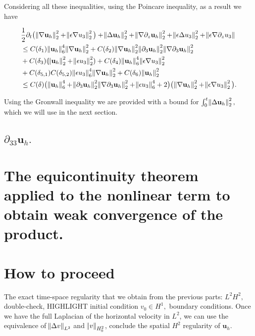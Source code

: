 \documentclass[11pt]{article}
\begin{document}
Considering all these inequalities, using the Poincare inequality, as a result we have

\begin{equation}
  \begin{split}
& \frac{1}{2} \partial_t  \big( \norm{\nabla \mathbf{u}_h}^2_2 + \norm{\epsilon \nabla u_3}^2_2 \big ) + \norm{\Delta \mathbf{u}_h}^2_2 + \norm{\nabla \partial_z \mathbf{u}_h}^2_2 + \norm{\epsilon \Delta u_3}^2_2 + \norm{\epsilon \nabla \partial_z u_3} \\
& \leq C(\delta_1) \norm{\mathbf{u}_h}^4_6 \norm{\nabla \mathbf{u}_h}_2^2 + C(\delta_2) \norm{\nabla \mathbf{u}_h}_2^2 \norm{\partial_3 \mathbf{u}_h}^2_2 \norm{\nabla \partial_3 \mathbf{u}_h}^2_2 \\
& + C(\delta_3) (\norm{ \mathbf{u}_h}^2_2 + \norm{ \epsilon u_3}^2_2) + C(\delta_4) \norm{\mathbf{u}_h}^4_6 \norm{\epsilon \nabla u_3}^2_2 \\
& + C(\delta_{5,1}) C(\delta_{5,2}) \norm{\epsilon u_3}^4_6 \norm{\nabla \mathbf{u}_h}^2_2 + C(\delta_6) \norm{\mathbf{u}_h}_2^2 \\
& \leq C(\delta) \big ( \norm{\mathbf{u}_h}^4_6 +\norm{\partial_3 \mathbf{u}_h}^2_2 \norm{\nabla \partial_3 \mathbf{u}_h}^2_2 + \norm{\epsilon u_3}^4_6 + 2 \big) \big( \norm{\nabla \mathbf{u}_h}^2_2 + \norm{\epsilon \nabla u_3}^2_2 \big ).
  \end{split}
\end{equation}

Using the Gronwall inequality we are provided with a bound for $\int_0^t \norm{\Delta \mathbf{u}_h}^2_2,$ which we will use in the next section.

\subsection{$\partial_{33} \mathbf{u}_h.$}

\section{The equicontinuity theorem applied to the nonlinear term to obtain weak convergence of the product.}

\section{How to proceed}

The exact time-space regularity that we obtain from the previous parts: $L^2 H^2,$ double-check, HIGHLIGHT initial condition $v_0 \in H^1,$ boundary conditions. Once we have the full Laplacian of the horizontal velocity in $L^2$, we can use the equivalence of $\norm{\Delta v}_{L^2}$ and $\norm{v}_{H^2_0}$, conclude the spatial $H^2$ regularity of $\mathbf{u}_h.$
\end{document}
